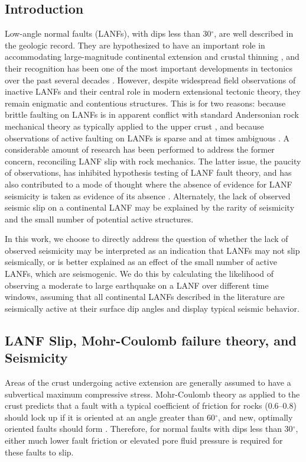\documentclass[twocolumn,grl]{AGUTeX}
\begin{document}
\begin{article}

\section{Introduction}
Low-angle normal faults (LANFs), with dips less than 30$^\circ$, are well described in the geologic record. They are hypothesized to have an important role in accommodating large-magnitude continental extension \citep{howard1987crustal} and crustal thinning \citep{lister1986detachment}, and their recognition has been one of the most important developments in tectonics over the past several decades \citep{wernicke2009detachment}. However, despite widespread field observations of inactive LANFs and their central role in modern extensional tectonic theory, they remain enigmatic and contentious structures. This is for two reasons: because brittle faulting on LANFs is in apparent conflict with standard Andersonian rock mechanical theory as typically applied to the upper crust \citep{axen2004lanfmech}, and because observations of active faulting on LANFs is sparse and at times ambiguous \citep{wernicke1995seis}. A considerable amount of research has been performed to address the former concern, reconciling LANF slip with rock mechanics. The latter issue, the paucity of observations, has inhibited hypothesis testing of LANF fault theory, and has also contributed to a mode of thought where the absence of evidence for LANF seismicity is taken as evidence of its absence \citep{jackson1987, collettinisibson2001}. Alternately, the lack of observed seismic slip on a continental LANF may be explained by the rarity of seismicity and the small number of potential active structures.

In this work, we choose to directly address the question of whether the lack of observed seismicity may be interpreted as an indication that LANFs may not slip seismically, or is better explained as an effect of the small number of active LANFs, which are seismogenic.  We do this by calculating the likelihood of observing a moderate to large earthquake on a LANF over different time windows, assuming that all continental LANFs described in the literature are seismically active at their surface dip angles and display typical seismic behavior.

\subsection{LANF Slip, Mohr-Coulomb failure theory, and Seismicity}
Areas of the crust undergoing active extension are generally assumed to have a subvertical maximum compressive stress.  Mohr-Coulomb theory as applied to the crust predicts that a fault with a typical coefficient of friction for rocks (0.6--0.8) should lock up if it is oriented at an angle greater than 60$^\circ$, and new, optimally oriented faults should form \citep{sibson1985}.  Therefore, for normal faults with dips less than 30$^\circ$, either much lower fault friction or elevated pore fluid pressure is required for these faults to slip.


\end{article}
\end{document}
